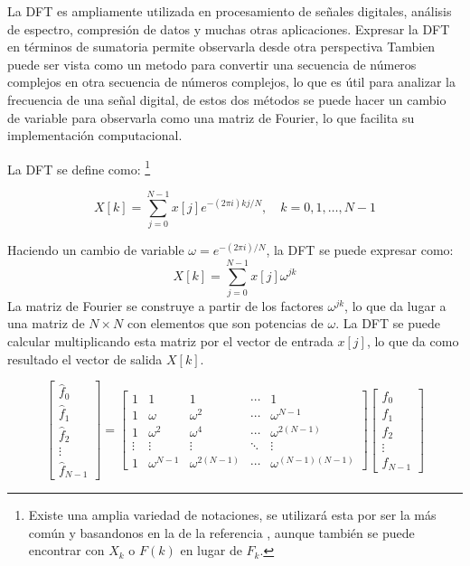 \documentclass[12pt]{article}
\begin{document}
La DFT es ampliamente utilizada en procesamiento de señales digitales, análisis de espectro, compresión de datos y muchas otras aplicaciones. Expresar la DFT en términos de sumatoria permite observarla desde otra perspectiva Tambien puede ser vista como un metodo para convertir una secuencia de números complejos en otra secuencia de números complejos, lo que es útil para analizar la frecuencia de una señal digital, de estos dos métodos se puede hacer un cambio de variable para observarla como una matriz de Fourier, lo que facilita su implementación computacional.



La DFT se define como: \footnote{Existe una amplia variedad de notaciones, se utilizará esta por ser la más común y basandonos en la de la referencia \cite{statlect}, aunque también se puede encontrar con $X_k$ o $F(k)$ en lugar de $F_k$.}  

\begin{equation}
X[k]= \sum_{j=0}^{N-1} x[j] e^{-(2\pi i) k j  / N}, \quad k = 0, 1, \ldots, N-1
\end{equation}

Haciendo un cambio de variable $\omega = e^{-(2\pi i) / N}$, la DFT se puede expresar como:
$$
X[k]= \sum_{j=0}^{N-1} x[j] \omega^{ jk }
$$
La matriz de Fourier se construye a partir de los factores $\omega^{jk}$, lo que da lugar a una matriz de $N \times N$ con elementos que son potencias de $\omega$. La DFT se puede calcular multiplicando esta matriz por el vector de entrada $x[j]$, lo que da como resultado el vector de salida $X[k]$.

\begin{equation}
\label{eq:dft-matrixC}
\begin{bmatrix}
\hat{f}_0 \\
\hat{f}_1 \\
\hat{f}_2 \\
\vdots \\
\hat{f}_{N-1}
\end{bmatrix}
=
\begin{bmatrix}
1 & 1 & 1 & \cdots & 1 \\
1 & \omega & \omega^2 & \cdots & \omega^{N-1} \\
1 & \omega^2 & \omega^4 & \cdots & \omega^{2(N-1)} \\
\vdots & \vdots & \vdots & \ddots & \vdots \\
1 & \omega^{N-1} & \omega^{2(N-1)} & \cdots & \omega^{(N-1)(N-1)}
\end{bmatrix}
\begin{bmatrix}
f_0 \\
f_1 \\
f_2 \\
\vdots \\
f_{N-1}
\end{bmatrix}
\end{equation}
\end{document}
